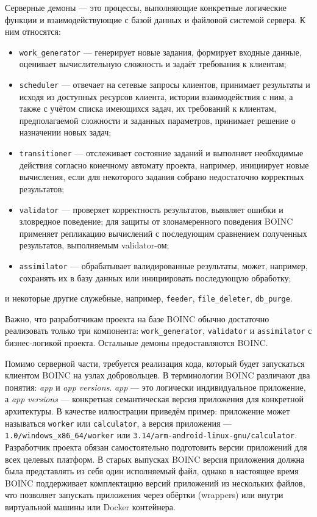 \documentclass[a4paper,12pt]{extarticle}
\begin{document}
Серверные демоны — это процессы, выполняющие конкретные логические функции и взаимодействующие с базой данных и файловой системой сервера. К ним относятся:
\begin{itemize}
    \item \texttt{work\_generator} — генерирует новые задания, формирует входные данные, оценивает вычислительную сложность и задаёт требования к клиентам;
    \item \texttt{scheduler} — отвечает на сетевые запросы клиентов, принимает результаты и исходя из доступных ресурсов клиента, истории взаимодействия с ним, а также с учётом списка имеющихся задач, их требований к клиентам, предполагаемой сложности и заданных параметров, принимает решение о назначении новых задач;
    \item \texttt{transitioner} — отслеживает состояние заданий и выполняет необходимые действия согласно конечному автомату проекта, например, инициирует новые вычисления, если для некоторого задания собрано недостаточно корректных результатов;
    \item \texttt{validator} — проверяет корректность результатов, выявляет ошибки и зловредное поведение; для защиты от злонамеренного поведения BOINC применяет репликацию вычислений с последующим сравнением полученных результатов, выполняемым validator-ом;
    \item \texttt{assimilator} — обрабатывает валидированные результаты, может, например, сохранять их в базу данных или инициировать последующую обработку;
\end{itemize}
и некоторые другие служебные, например, \texttt{feeder}, \texttt{file\_deleter}, \texttt{db\_purge}.

Важно, что разработчикам проекта на базе BOINC обычно достаточно реализовать только три компонента: \texttt{work\_generator}, \texttt{validator} и \texttt{assimilator} с бизнес-логикой проекта. Остальные демоны предоставляются BOINC.

Помимо серверной части, требуется реализация кода, который будет запускаться клиентом BOINC на узлах добровольцев. В терминологии BOINC различают два понятия: \textit{app} и \textit{app versions}. \textit{app} — это логически индивидуальное приложение, а \textit{app versions} — конкретная семантическая версия приложения для конкретной архитектуры. В качестве иллюстрации приведём пример: приложение может называться \texttt{worker} или \texttt{calculator}, а версия приложения — \texttt{1.0/windows\_x86\_64/worker} или \texttt{3.14/arm-android-linux-gnu/calculator}. Разработчик проекта обязан самостоятельно подготовить версии приложений для всех целевых платформ. В старых выпусках BOINC версия приложения должна была представлять из себя один исполняемый файл, однако в настоящее время BOINC поддерживает комплектацию версий приложений из нескольких файлов, что позволяет запускать приложения через обёртки (wrappers) или внутри виртуальной машины или Docker контейнера.
\end{document}
